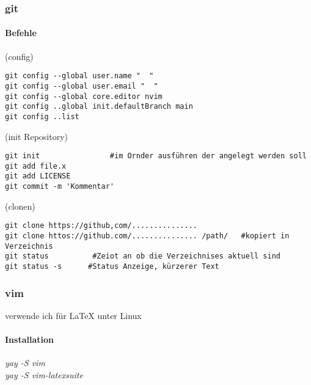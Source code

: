 \documentclass[10pt,a4paper,twoside]{book}
\begin{document}
\subsubsection{git}
\paragraph{Befehle}
(config)\\
\begin{verbatim}
git config --global user.name "  "
git config --global user.email "  "
git config --global core.editor nvim
git config ..global init.defaultBranch main
git config ..list
\end{verbatim}
(init Repository)
\begin{verbatim}
git init				#im Ornder ausführen der angelegt werden soll
git add file.x
git add LICENSE
git commit -m 'Kommentar'
\end{verbatim}
(clonen)\\
\begin{verbatim}
git clone https://github,com/...............
git clone httos://github.com/............... /path/   #kopiert in Verzeichnis
git status			#Zeiot an ob die Verzeichnises aktuell sind
git status -s      #Status Anzeige, kürzerer Text
\end{verbatim}
\subsubsection{vim}
verwende ich für LaTeX unter Linux\\
\paragraph{Installation}
\textit{yay -S vim}\\
\textit{yay -S vim-latexsuite}\\
\end{document}
